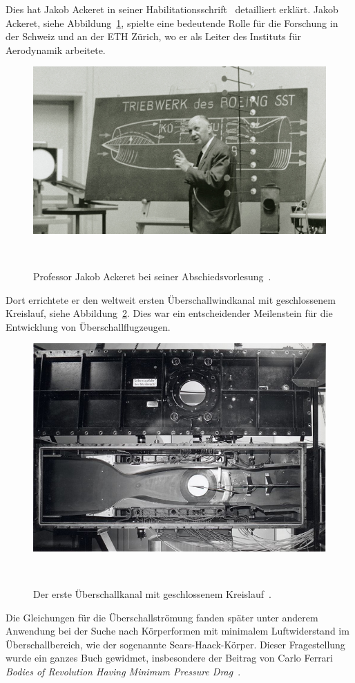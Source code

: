 Dies hat Jakob Ackeret in seiner Habilitationsschrift~\cite{Ackeret1928}
detailliert erklärt.
Jakob Ackeret, siehe Abbildung~\ref{fig:ackeret}, spielte eine bedeutende 
Rolle für die Forschung in der Schweiz und an der ETH Zürich, 
wo er als Leiter des Instituts für Aerodynamik arbeitete.
\begin{figure}
    \centering
    \includegraphics[width=\textwidth]{papers/ueberschall/figures/Jakob_Ackeret_1967.jpg}
    \caption{Professor Jakob Ackeret bei seiner Abschiedsvorlesung~\cite{AckeretFoto1967}.}
    ~\label{fig:ackeret}
\end{figure}
Dort errichtete er den weltweit ersten Überschallwindkanal 
mit geschlossenem Kreislauf, siehe Abbildung~\ref{fig:windkanal}.
Dies war ein entscheidender Meilenstein für 
die Entwicklung von Überschallflugzeugen.
\begin{figure}
    \centering
    \includegraphics[width=\textwidth]{papers/ueberschall/figures/Windkanal.jpg}
    \caption{Der erste Überschallkanal mit geschlossenem Kreislauf~\cite{ETHeritage2020}.}
    ~\label{fig:windkanal}
\end{figure}

Die Gleichungen für die Überschallströmung fanden 
später unter anderem Anwendung bei der Suche nach Körperformen 
mit minimalem Luftwiderstand im Überschallbereich, 
wie der sogenannte Sears-Haack-Körper. 
Dieser Fragestellung wurde ein ganzes Buch gewidmet, 
insbesondere der Beitrag von Carlo Ferrari
\textit{Bodies of Revolution Having Minimum Pressure Drag}~\cite{Ferrari1965}.

